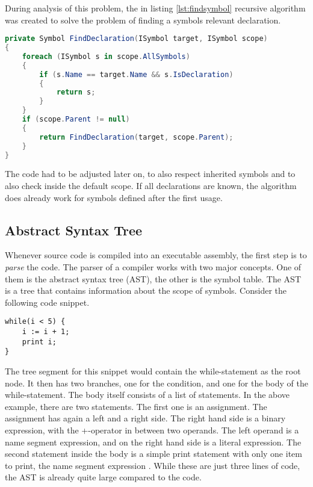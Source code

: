 During analysis of this problem, the in listing \ref{lst:findsymbol} recursive algorithm was created
to solve the problem of finding a symbols relevant declaration.

\begin{lstlisting}[language=csharp, caption={Finding Symbol Definition}, captionpos=b, label={lst:findsymbol}]
private Symbol FindDeclaration(ISymbol target, ISymbol scope)
{
    foreach (ISymbol s in scope.AllSymbols)
    {
        if (s.Name == target.Name && s.IsDeclaration)
        {
            return s;
        }
    }
    if (scope.Parent != null)
    {
        return FindDeclaration(target, scope.Parent);
    }
}
\end{lstlisting}
The code had to be adjusted later on, to also respect inherited symbols and to also check inside the default scope.
If all declarations are known, the algorithm does already work for symbols defined after the first usage.

\subsection{Abstract Syntax Tree}
Whenever source code is compiled into an executable assembly, the first step is to \textit{parse} the code.
The parser of a compiler works with two major concepts.
One of them is the abstract syntax tree (AST), the other is the symbol table. 
The AST is a tree that contains information about the scope of symbols.
Consider the following code snippet.

\begin{lstlisting}[language=dafny, caption={AST Demo Snippet}, captionpos=b, label={lst:astsnipped}]
while(i < 5) {
    i := i + 1;
    print i;
}
\end{lstlisting}

The tree segment for this snippet would contain the while-statement as the root node.
It then has two branches, one for the condition, and one for the body of the while-statement.
The body itself consists of a list of statements.
In the above example, there are two statements.
The first one is an assignment.
The assignment has again a left and a right side.
The right hand side is a binary expression, with the +-operator in between two operands.
The left operand is a name segment expression, and on the right hand side is a literal expression.
The second statement inside the body is a simple print statement with only one item to print, the name segment expression .
While these are just three lines of code, the AST is already quite large compared to the code.\\

